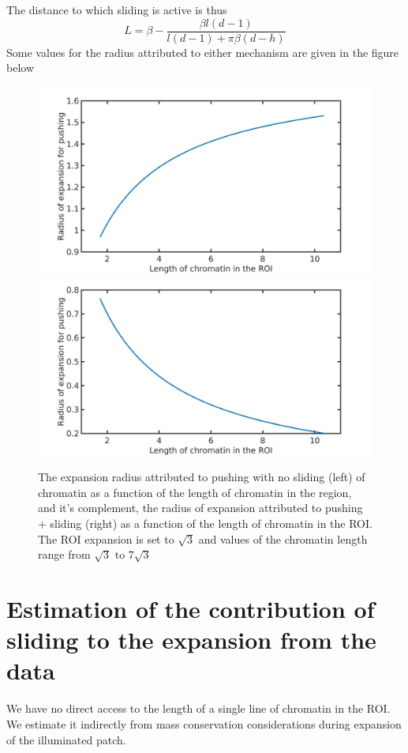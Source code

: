 \documentclass[12pt]{report}
\begin{document}
		The distance to which sliding is active is thus 
		\begin{equation}\label{eq:expansionRadiusDueToSliding}
		L = \beta- \frac{\beta l(d-1)}{l(d-1) +\pi \beta(d-h)}
		\end{equation}
		Some values for the radius attributed to either mechanism are given in the figure below
		\begin{figure}[H]
			
			\includegraphics[width=0.5\linewidth, height=0.3\textheight]{Images/SlidingModel/radiusOfPushingVsLengthOfChromainInROI}
			\includegraphics[width=0.5\linewidth, height=0.3\textheight]{Images/SlidingModel/radiusOfSlidingVsLengthOfChromatinInROI}
			\caption{The expansion radius attributed to pushing with no sliding (left) of chromatin as a function of the length of chromatin in the region, and it's complement, the radius of expansion attributed to pushing + sliding (right) as a function of the length of chromatin in the ROI. The ROI expansion is set to $\sqrt{3}$ and values of the chromatin length range from $\sqrt{3}$ to $7\sqrt{3}$}
			\label{fig:radiiVsLengthOfChromainInROI}
		\end{figure}
		
									
		\section{Estimation of the contribution of sliding to the expansion from the data}
		We have no direct access to the length of a single line of chromatin in the ROI. We estimate it indirectly from mass conservation considerations during expansion of the illuminated patch. 
		
\end{document}
